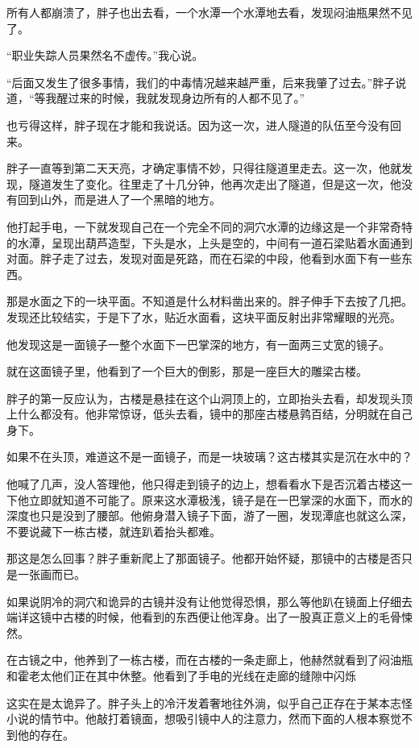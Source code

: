 所有人都崩溃了，胖子也出去看，一个水潭一个水潭地去看，发现闷油瓶果然不见了。

“职业失踪人员果然名不虚传。”我心说。

“后面又发生了很多事情，我们的中毒情况越来越严重，后来我肇了过去。”胖子说道，“等我醒过来的时候，我就发现身边所有的人都不见了。”

也亏得这样，胖子现在才能和我说话。因为这一次，进人隧道的队伍至今没有回来。

胖子一直等到第二天天亮，才确定事情不妙，只得往隧道里走去。这一次，他就发现，隧道发生了变化。往里走了十几分钟，他再次走出了隧道，但是这一次，他没有回到山外，而是进人了一个黑暗的地方。

他打起手电，一下就发现自己在一个完全不同的洞穴水潭的边缘这是一个非常奇特的水潭，呈现出葫芦造型，下头是水，上头是空的，中间有一道石梁贴着水面通到对面。胖子走了过去，发现对面是死路，而在石梁的中段，他看到水面下有一些东西。

那是水面之下的一块平面。不知道是什么材料凿出来的。胖子伸手下去按了几把。发现还比较结实，于是下了水，贴近水面看，这块平面反射出非常耀眼的光亮。

他发现这是一面镜子一整个水面下一巴掌深的地方，有一面两三丈宽的镜子。

就在这面镜子里，他看到了一个巨大的倒影，那是一座巨大的雕梁古楼。

胖子的第一反应认为，古楼是悬挂在这个山洞顶上的，立即抬头去看，却发现头顶上什么都没有。他非常惊讶，低头去看，镜中的那座古楼悬鹑百结，分明就在自己身下。

如果不在头顶，难道这不是一面镜子，而是一块玻璃？这古楼其实是沉在水中的？

他喊了几声，没人答理他，他只得走到镜子的边上，想看看水下是否沉着古楼这一下他立即就知道不可能了。原来这水潭极浅，镜子是在一巴掌深的水面下，而水的深度也只是没到了腰部。他俯身潜入镜子下面，游了一圈，发现潭底也就这么深，不要说藏下一栋古楼，就连趴着抬头都难。

那这是怎么回事？胖子重新爬上了那面镜子。他都开始怀疑，那镜中的古楼是否只是一张画而已。

如果说阴冷的洞穴和诡异的古镜并没有让他觉得恐惧，那么等他趴在镜面上仔细去端详这镜中古楼的时候，他看到的东西便让他浑身。出了一股真正意义上的毛骨悚然。

在古镜之中，他养到了一栋古楼，而在古楼的一条走廊上，他赫然就看到了闷油瓶和霍老太他们正在其中休整。他看到了手电的光线在走廊的缝隙中闪烁

这实在是太诡异了。胖子头上的冷汗发着奢地往外淌，似乎自己正存在于某本志怪小说的情节中。他敲打着镜面，想吸引镜中人的注意力，然而下面的人根本察觉不到他的存在。

